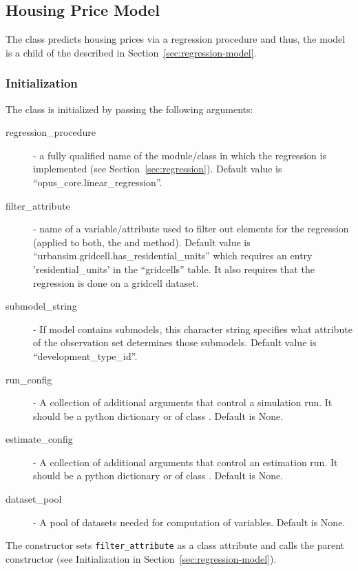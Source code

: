 %
\subsection{Housing Price Model}
%
\label{sec:housing-price-model}

The   
class predicts housing prices via a regression procedure and thus,
the model is a child of the   described in
Section~\ref{sec:regression-model}.

\subsubsection{Initialization}
%
The class is initialized by passing the following arguments:
\begin{description}
\item[regression_procedure] - a fully qualified name of the module/class in
  which the regression is implemented (see
  Section~\ref{sec:regression}). Default value is
  ``opus_core.linear_regression''.
\item[filter_attribute] - name of a variable/attribute used to filter out elements for
  the regression (applied to both, the  and 
  method). Default value is
  ``urbansim.gridcell.has_residential_units'' which requires an entry 'residential_units'
  in the ``gridcells'' table.
  It also requires that the regression is done on a gridcell dataset.
\item[submodel_string] - If model contains submodels, this character string
  specifies what attribute of the observation set determines those
  submodels. Default value is ``development_type_id''.
\item[run_config] - A collection of additional arguments that control a
  simulation run. It should be a python dictionary or of class . Default is None.
\item[estimate_config] - A collection of additional arguments that control an
  estimation run. It should be a python dictionary or of class . Default is None.
  \item[dataset_pool] - A pool of datasets needed for computation of variables. Default is None.
\end{description}
The constructor sets \verb|filter_attribute| as a class attribute and calls the parent
constructor (see Initialization in Section~\ref{sec:regression-model}).

